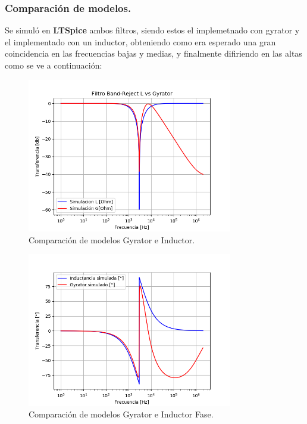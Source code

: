 \subsubsection{Comparación de modelos.}
Se simuló en \textbf{LTSpice} ambos filtros, siendo estos el implemetnado con gyrator y el implementado con un inductor, obteniendo como era esperado una gran coincidencia en las frecuencias bajas y medias, y finalmente difiriendo en las altas como se ve a continuación:
\begin{figure}[H]	
	\centering
	\includegraphics[width=0.8\textwidth]{ImagenesEj2/simBR.PNG}
	\caption{Comparación de modelos Gyrator e Inductor.}
	\label{fig:gyrIndBR}
\end{figure}
\begin{figure}[H]	
	\centering
	\includegraphics[width=0.8\textwidth]{ImagenesEj2/simBRP.PNG}
	\caption{Comparación de modelos Gyrator e Inductor Fase.}
	\label{fig:gyrIndPBR}
\end{figure}
